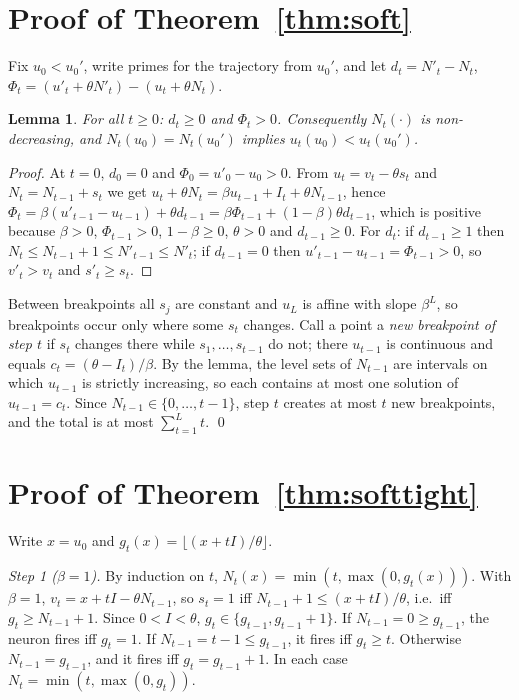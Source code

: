 \documentclass[10pt]{article}
\newtheorem{lemma}[theorem]{Lemma}
\theoremstyle{remark}
\begin{document}



\appendix
\section{Proof of Theorem~\ref{thm:soft}}
\label{app:soft}

Fix $u_0<u_0'$, write primes for the trajectory from $u_0'$, and let $d_t=N'_t-N_t$, $\Phi_t=(u'_t+\theta N'_t)-(u_t+\theta N_t)$.

\begin{lemma}
For all $t\ge0$: $d_t\ge0$ and $\Phi_t>0$. Consequently $N_t(\cdot)$ is non-decreasing, and $N_t(u_0)=N_t(u_0')$ implies $u_t(u_0)<u_t(u_0')$.
\end{lemma}
\begin{proof}
At $t=0$, $d_0=0$ and $\Phi_0=u'_0-u_0>0$. From $u_t=v_t-\theta s_t$ and $N_t=N_{t-1}+s_t$ we get $u_t+\theta N_t=\beta u_{t-1}+I_t+\theta N_{t-1}$, hence
$\Phi_t=\beta(u'_{t-1}-u_{t-1})+\theta d_{t-1}=\beta\Phi_{t-1}+(1-\beta)\theta d_{t-1}$,
which is positive because $\beta>0$, $\Phi_{t-1}>0$, $1-\beta\ge0$, $\theta>0$ and $d_{t-1}\ge0$.
For $d_t$: if $d_{t-1}\ge1$ then $N_t\le N_{t-1}+1\le N'_{t-1}\le N'_t$; if $d_{t-1}=0$ then $u'_{t-1}-u_{t-1}=\Phi_{t-1}>0$, so $v'_t>v_t$ and $s'_t\ge s_t$.
\end{proof}

Between breakpoints all $s_j$ are constant and $u_L$ is affine with slope $\beta^L$, so breakpoints occur only where some $s_t$ changes. Call a point a \emph{new breakpoint of step $t$} if $s_t$ changes there while $s_1,\ldots,s_{t-1}$ do not; there $u_{t-1}$ is continuous and equals $c_t=(\theta-I_t)/\beta$. By the lemma, the level sets of $N_{t-1}$ are intervals on which $u_{t-1}$ is strictly increasing, so each contains at most one solution of $u_{t-1}=c_t$. Since $N_{t-1}\in\{0,\ldots,t-1\}$, step $t$ creates at most $t$ new breakpoints, and the total is at most $\sum_{t=1}^Lt$. \qed

\section{Proof of Theorem~\ref{thm:softtight}}
\label{app:softtight}

Write $x=u_0$ and $g_t(x)=\lfloor (x+tI)/\theta\rfloor$.

\emph{Step 1 ($\beta=1$).} By induction on $t$, $N_t(x)=\min(t,\max(0,g_t(x)))$. With $\beta=1$, $v_t=x+tI-\theta N_{t-1}$, so $s_t=1$ iff $N_{t-1}+1\le (x+tI)/\theta$, i.e.\ iff $g_t\ge N_{t-1}+1$. Since $0<I<\theta$, $g_t\in\{g_{t-1},g_{t-1}+1\}$. If $N_{t-1}=0\ge g_{t-1}$, the neuron fires iff $g_t=1$. If $N_{t-1}=t-1\le g_{t-1}$, it fires iff $g_t\ge t$. Otherwise $N_{t-1}=g_{t-1}$, and it fires iff $g_t=g_{t-1}+1$. In each case $N_t=\min(t,\max(0,g_t))$.
\end{document}
